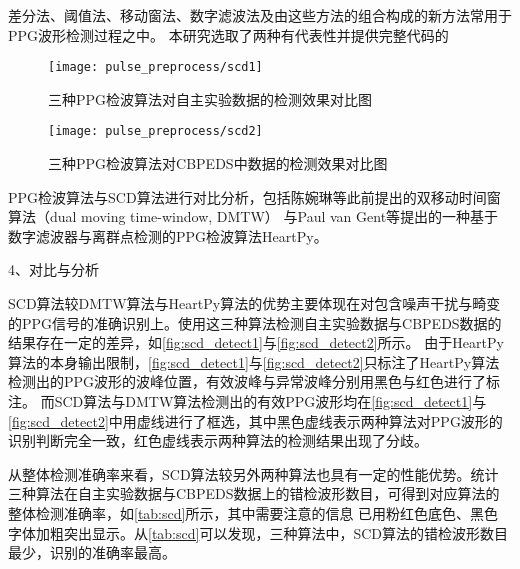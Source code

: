 差分法、阈值法、移动窗法、数字滤波法及由这些方法的组合构成的新方法常用于PPG波形检测过程之中\cite{Chen2019,cwl,Chen2021,ChenH2019,QYY2008,SJ2007,van2019,van20192}。
本研究选取了两种有代表性并提供完整代码的
\begin{figure}[htbp]
    \centering
    \texttt{[image: pulse\_preprocess/scd1]}
    \caption{\label{fig:scd_detect1}三种PPG检波算法对自主实验数据的检测效果对比图}
\end{figure}

\begin{figure}[htbp]
    \centering
    \texttt{[image: pulse\_preprocess/scd2]}
    \caption{\label{fig:scd_detect2}三种PPG检波算法对CBPEDS中数据的检测效果对比图}
\end{figure}
\noindent
PPG检波算法与SCD算法进行对比分析，包括陈婉琳等\cite{Chen2019,cwl}此前提出的双移动时间窗算法（dual moving time-window, DMTW）
与Paul van Gent等\cite{van2019,van20192}提出的一种基于数字滤波器与离群点检测的PPG检波算法HeartPy。

4、对比与分析

SCD算法较DMTW算法与HeartPy算法的优势主要体现在对包含噪声干扰与畸变的PPG信号的准确识别上。使用这三种算法检测自主实验数据与CBPEDS数据的结果存在一定的差异，如\autoref{fig:scd_detect1}与\autoref{fig:scd_detect2}所示。
由于HeartPy算法的本身输出限制，\autoref{fig:scd_detect1}与\autoref{fig:scd_detect2}只标注了HeartPy算法检测出的PPG波形的波峰位置，有效波峰与异常波峰分别用黑色与红色进行了标注。
而SCD算法与DMTW算法检测出的有效PPG波形均在\autoref{fig:scd_detect1}与\autoref{fig:scd_detect2}中用虚线进行了框选，其中黑色虚线表示两种算法对PPG波形的识别判断完全一致，红色虚线表示两种算法的检测结果出现了分歧。

从整体检测准确率来看，SCD算法较另外两种算法也具有一定的性能优势。统计三种算法在自主实验数据与CBPEDS数据上的错检波形数目，可得到对应算法的整体检测准确率，如\autoref{tab:scd}所示，其中需要注意的信息
已用粉红色底色、黑色字体加粗突出显示。从\autoref{tab:scd}可以发现，三种算法中，SCD算法的错检波形数目最少，识别的准确率最高。

